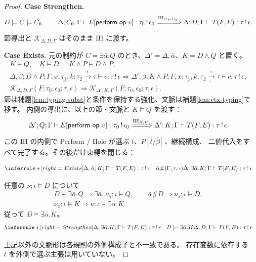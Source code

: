 \documentclass[a4paper,11pt]{article}
\theoremstyle{definition}
\newenvironment{Case}[1]{\par\smallskip\noindent\textbf{Case #1.}\enspace\ignorespaces}{\par}
\newcommand{\op}{\mathsf{op}}
\newcommand{\arr}[3]{#1\xrightarrow{#2}#3}
\newcommand{\jj}[6]{#1;#2;#3\vdash #4:#5\,!\,#6}
\newcommand{\perform}[2]{\mathsf{perform}\ #1\ #2}
\newcommand{\mono}[1]{\underline{#1}}
\begin{document}
\begin{proof}
\begin{Case}{Strengthen}
\[
 D\models C\models C_0,\qquad
 \jj\Delta{C_0}\Gamma{E[\perform\op v]}{\tau_0}{\epsilon_0}
 \xRightarrow{\mathrm{IH}_{D\models C_0}}\jj\Delta D\Gamma{T(F,E)}\tau\epsilon.
\]
節導出と $\mathcal K_{\Delta,D,\Gamma}$ はそのまま IH に渡す。
\end{Case}

\begin{Case}{Exists}
元の制約が $C=\exists\bar\alpha.Q$ のとき、$\Delta'=\Delta,\bar\alpha$、$K=D\land Q$ と置く。
\begin{gather*}
 K\models Q,\quad K\models D,\quad K\land P\models D\land P,\\
 \jj{\Delta,\bar\beta}{D\land P}{\Gamma,x:\mono{\tau_1},k:\mono{\arr{\tau_2}\epsilon\tau}}c\tau\epsilon
 \Longrightarrow
 \jj{\Delta',\bar\beta}{K\land P}{\Gamma,x:\mono{\tau_1},k:\mono{\arr{\tau_2}\epsilon\tau}}c\tau\epsilon,\\
 \mathcal K_{\Delta,D,\Gamma}(F;\tau_0,\epsilon_0;\tau,\epsilon)
 \Longrightarrow\mathcal K_{\Delta',K,\Gamma}(F;\tau_0,\epsilon_0;\tau,\epsilon).
\end{gather*}
節は補題\ref{lem:typing-subst}と条件を保持する強化、文脈は補題\ref{lem:ctx-typing}で移す。
内側の導出に、以上の節・文脈と $K\models Q$ を渡す：
\[
 \jj{\Delta'}Q\Gamma{E[\perform\op v]}{\tau_0}{\epsilon_0}
 \xRightarrow{\mathrm{IH}_{K,F}}
 \jj{\Delta'}K\Gamma{T(F,E)}\tau\epsilon.
\]
この IH の内側で Perform / Hole が選ぶ $\bar t$、$P[\bar t/\bar\beta]$、継続構成、
二値代入をすべて完了する。その後だけ束縛を閉じる：

\[
\inferrule*[right=Exists]{\jj{\Delta,\bar\alpha}{K}{\Gamma}{T(F,E)}{\tau}{\epsilon}\quad\bar\alpha\#(\Gamma,\tau,\epsilon)}{\jj{\Delta}{\exists\bar\alpha.K}{\Gamma}{T(F,E)}{\tau}{\epsilon}}
\]

任意の $\nu;\iota\models D$ について
\begin{gather*}
 D\models\exists\bar\alpha.Q\Longrightarrow
 \exists\bar a.\ \nu_a;\iota\models Q,\qquad
 \bar\alpha\#D\Longrightarrow\nu_a;\iota\models D,\\
 \nu_a;\iota\models K\Longrightarrow\nu;\iota\models\exists\bar\alpha.K.
\end{gather*}
従って $D\models\exists\bar\alpha.K$。
\[
\inferrule*[right=Strengthen]{\jj{\Delta}{\exists\bar\alpha.K}{\Gamma}{T(F,E)}{\tau}{\epsilon}\quad D\models\exists\bar\alpha.K}{\jj{\Delta}{D}{\Gamma}{T(F,E)}{\tau}{\epsilon}}
\]
\end{Case}
上記以外の文脈形は各規則の外側構成子と不一致である。
存在変数に依存する $\bar t$ を外側で選ぶ主張は用いていない。
\end{proof}
\end{document}
